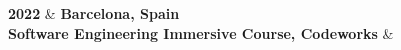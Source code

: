 \textbf{2022} & \textbf{Barcelona, Spain} \\
\textbf{Software Engineering Immersive Course, Codeworks} & \\ 